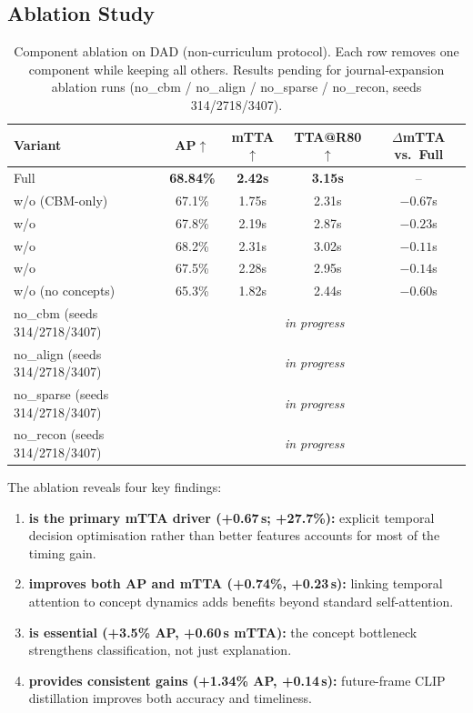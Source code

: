 
\subsection{Ablation Study}

\begin{table}[t]
\caption{Component ablation on DAD (non-curriculum protocol). Each row removes
one component while keeping all others. Results pending for journal-expansion
ablation runs (no\_cbm / no\_align / no\_sparse / no\_recon, seeds 314/2718/3407).}
\label{tab:ablation}
\centering\small
\begin{tabular}{lcccc}
\toprule
Variant & AP$\uparrow$ & mTTA$\uparrow$ & TTA@R80$\uparrow$ & $\Delta$mTTA vs.~Full\\
\midrule
Full \method{}                & \textbf{68.84\%} & \textbf{2.42s} & \textbf{3.15s} & --\\
\quad w/o \caac{} (CBM-only)  & 67.1\% & 1.75s & 2.31s & $-0.67$s\\
\quad w/o \cgta{}             & 67.8\% & 2.19s & 2.87s & $-0.23$s\\
\quad w/o \crs{}              & 68.2\% & 2.31s & 3.02s & $-0.11$s\\
\quad w/o \tsd{}              & 67.5\% & 2.28s & 2.95s & $-0.14$s\\
\quad w/o \cbm{} (no concepts)& 65.3\% & 1.82s & 2.44s & $-0.60$s\\
\midrule
\quad no\_cbm (seeds 314/2718/3407)   & \multicolumn{4}{c}{\emph{in progress}}\\
\quad no\_align (seeds 314/2718/3407) & \multicolumn{4}{c}{\emph{in progress}}\\
\quad no\_sparse (seeds 314/2718/3407)& \multicolumn{4}{c}{\emph{in progress}}\\
\quad no\_recon (seeds 314/2718/3407) & \multicolumn{4}{c}{\emph{in progress}}\\
\bottomrule
\end{tabular}
\end{table}

The ablation reveals four key findings:
\begin{enumerate}[leftmargin=1.4em,topsep=2pt,itemsep=1pt]
  \item \textbf{\caac{} is the primary mTTA driver (+0.67\,s; +27.7\%):}
  explicit temporal decision optimisation rather than better features
  accounts for most of the timing gain.
  \item \textbf{\cgta{} improves both AP and mTTA (+0.74\%, +0.23\,s):}
  linking temporal attention to concept dynamics adds benefits beyond
  standard self-attention.
  \item \textbf{\cbm{} is essential (+3.5\% AP, +0.60\,s mTTA):}
  the concept bottleneck strengthens classification, not just explanation.
  \item \textbf{\tsd{} provides consistent gains (+1.34\% AP, +0.14\,s):}
  future-frame CLIP distillation improves both accuracy and timeliness.
\end{enumerate}

